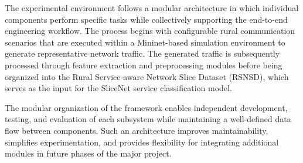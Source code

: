\documentclass[12pt,a4paper]{report}
\begin{document}
	The experimental environment follows a modular architecture in which individual components perform specific tasks while collectively supporting the end-to-end engineering workflow. The process begins with configurable rural communication scenarios that are executed within a Mininet-based simulation environment to generate representative network traffic. The generated traffic is subsequently processed through feature extraction and preprocessing modules before being organized into the Rural Service-aware Network Slice Dataset (RSNSD), which serves as the input for the SliceNet service classification model.
	
	The modular organization of the framework enables independent development, testing, and evaluation of each subsystem while maintaining a well-defined data flow between components. Such an architecture improves maintainability, simplifies experimentation, and provides flexibility for integrating additional modules in future phases of the major project.
	
\end{document}
